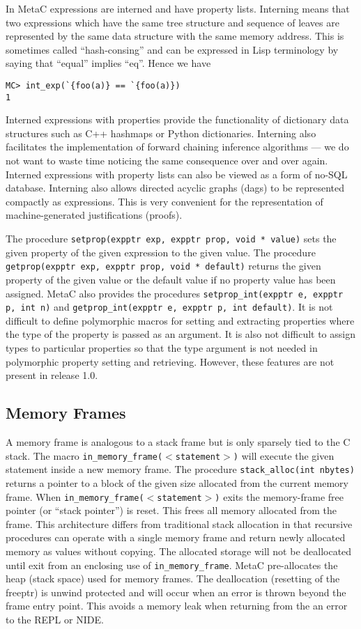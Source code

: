 \documentclass{article}
\begin{document}
In MetaC expressions are interned and have property lists.
Interning means that two expressions which have the same tree structure and sequence of leaves are represented by the same data structure with the same memory address.
This is sometimes called ``hash-consing'' and can be expressed in Lisp terminology by saying that ``equal'' implies ``eq''.
Hence we have
\begin{verbatim}
MC> int_exp(`{foo(a)} == `{foo(a)})
1
\end{verbatim}
Interned expressions with properties provide the functionality of dictionary data structures such as C++ hashmaps or Python dictionaries.
Interning also facilitates the implementation of forward chaining inference algorithms --- we do not want to waste time noticing the same
consequence over and over again.  Interned expressions with property lists can also be viewed as a form of no-SQL database.
Interning also allows directed acyclic graphs (dags) to be represented compactly as expressions.  This is very convenient
for the representation of machine-generated justifications (proofs).

The procedure {\tt setprop(expptr exp, expptr prop, void * value)}
sets the given property of the given expression to the given value.  The procedure {\tt getprop(expptr exp, expptr prop, void * default)} returns
the given property of the given value or the default value if no property value has been assigned.
MetaC also provides the procedures {\tt setprop\_int(expptr e, expptr p, int n)} and {\tt getprop\_int(expptr e, expptr p, int default)}.
It is not difficult to define polymorphic macros for setting and extracting properties where the type of the property is passed as an argument.
It is also not difficult to assign types to particular properties so that the type argument is not needed in polymorphic property setting and retrieving.
However, these features are not present in release 1.0.

\subsection{Memory Frames}
\label{sec:memory}

A memory frame is analogous to a stack frame but is only sparsely tied to the C stack.
The macro {\tt in\_memory\_frame($<$statement$>$)} will execute the given statement inside a new memory frame.
The procedure {\tt stack\_alloc(int nbytes)}
returns a pointer to a block of the given size allocated from the current memory frame. When {\tt in\_memory\_frame($<$statement$>$)}  exits
the memory-frame free pointer (or ``stack pointer'') is reset.  This frees all memory allocated from the frame.
This architecture differs from traditional stack allocation in that recursive procedures can operate with a single memory frame and return newly allocated memory as values
without copying.  The allocated storage will not be deallocated until exit from an enclosing use of {\tt in\_memory\_frame}.
MetaC pre-allocates the heap (stack space) used for memory frames.  The deallocation (resetting of the freeptr) is unwind protected and will occur
when an error is thrown beyond the frame entry point.  This avoids a memory leak when returning from the an error to the REPL or NIDE.
\end{document}
